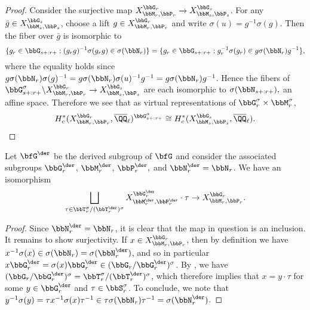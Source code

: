 \begin{proof}
  Consider the surjective map $X_{\bbM_r,\bbP_r}^{\bbG_r} \to X_{\bbM_s,\bbP_s}^{\bbG_s}$. For any $\bar g \in X_{\bbM_s,\bbP_s}^{\bbG_s}$, choose a lift $g \in X_{\bbM_r,\bbP_r}^{\bbG_r}$ and write $\sigma(u) = g^{-1} \sigma(g)$. Then the fiber over $\bar g$ is isomorphic to
  \begin{equation*}
    \{g_r \in \bbG_{s+:r+} : (g_r g)^{-1}\sigma(g_r g) \in \sigma(\bbN_r)\} 
    = \{g_r \in \bbG_{s+:r+} : g_r^{-1}\sigma(g_r) \in g \sigma(\bbN_r) g^{-1}\},
  \end{equation*}
  where the equality holds since $g \sigma(\bbN_r) \sigma(g)^{-1} = g \sigma(\bbN_r) \sigma(u)^{-1} g^{-1} = g \sigma(\bbN_r) g^{-1}$. Hence the fibers of $\bbG_{s+:r+}^\sigma\backslash X_{\bbM_r,\bbP_r}^{\bbG_r} \to X_{\bbM_s,\bbP_s}^{\bbG_s}$ are each isomorphic to $\sigma(\bbN_{s+:r+}),$ an affine space. Therefore we see that as virtual representations of $\bbG_r^\sigma \times \bbM_r^\sigma$,
  \begin{equation*}
    H_c^*(X_{\bbM_r,\bbP_r}^{\bbG_r}, \overline \QQ_\ell)^{\bbG_{s+:r+}^\sigma} \cong H_c^*(X_{\bbM_s,\bbP_s}^{\bbG_s}, \overline \QQ_\ell). \qedhere
  \end{equation*}
\end{proof}


\begin{lemma}\label{lem:der}
  Let $\bfG^\der$ be the derived subgroup of $\bfG$ and consider the associated subgroups $\bbG_r^{\der}$, $\bbM_r^{\der}$, $\bbP_r^{\der},$ and $\bbN_r^{\der} = \bbN_r$. We have an isomorphism
  \begin{equation*}
    \bigsqcup_{\tau \in \bbT_r^\sigma/(\bbT_r^{\der})^\sigma} X_{\bbM_r^{\der}, \bbP_r^\der}^{\bbG_r^\der} \cdot \tau \to X_{\bbM_r,\bbP_r}^{\bbG_r}.
  \end{equation*}
\end{lemma}

\begin{proof}
  Since $\bbN_r^{\der} = \bbN_r$, it is clear that the map in question is an inclusion. It remains to show surjectivity. If $x \in X_{\bbM_r,\bbP_r}^{\bbG_r}$, then by definition we have $x^{-1} \sigma(x) \in \sigma(\bbN_r) = \sigma(\bbN_r^{\der})$, and so in particular $x \bbG_r^\der = \sigma(x) \bbG_r^{\der} \in (\bbG_r/\bbG_r^{\der})^\sigma$. By \cite[Lemma 3.1.3]{Kal19}, we have $(\bbG_r/\bbG_r^{\der})^\sigma = \bbT_r^\sigma/(\bbT_r^\der)^\sigma$, which therefore implies that $x = y \cdot \tau$ for some $y \in \bbG_r^\der$ and $\tau \in \bbS_r^\sigma$. To conclude, we note that $y^{-1} \sigma(y) = \tau x^{-1} \sigma(x) \tau^{-1} \in \tau \sigma(\bbN_r) \tau^{-1} = \sigma(\bbN_r^\der)$.
\end{proof}





